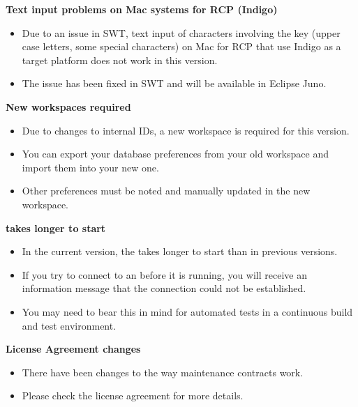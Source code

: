 \textbf{Text input problems on Mac systems for RCP (Indigo)}\\
\begin{itemize}
\item Due to an issue in SWT, text input of characters involving the  key (upper case letters, some special characters) on Mac for RCP \gdauts{} that use Indigo as a target platform does not work in this version.
\item The issue has been fixed in SWT and will be available in Eclipse Juno.
\end{itemize}



\textbf{New workspaces required}\\
\begin{itemize}
\item Due to changes to internal IDs, a new workspace is required for this version. 
\item You can export your database preferences from your old workspace and import them into your new one. 
\item Other preferences must be noted and manually updated in the new workspace. 
\end{itemize}

\textbf{\gdagent{} takes longer to start}
\begin{itemize}
\item In the current version, the \gdagent{} takes longer to start than in previous versions. 
\item If you try to connect to an \gdagent{} before it is running, you will receive an information message that the connection could not be established.
\item You may need to bear this in mind for automated tests in a continuous build and test environment.
\end{itemize}


\textbf{License Agreement changes}
\begin{itemize}
\item There have been changes to the way maintenance contracts work. 
\item Please check the license agreement for more details.
\end{itemize}

